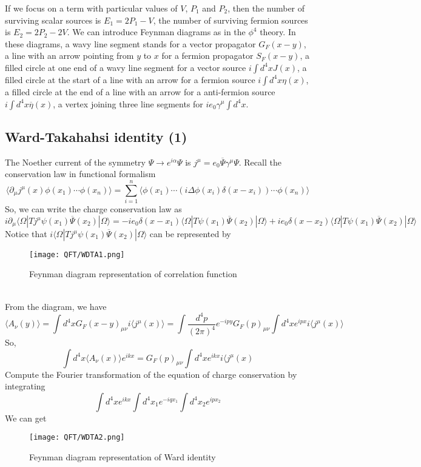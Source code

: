 If we focus on a term with particular values of $V$, $P_1$ and $P_2$, then the number of surviving scalar sources is $E_1 = 2P_1-V$, the number of surviving fermion sources is $E_2 = 2P_2-2V$.
We can introduce Feynman diagrams as in the $\phi^4$ theory. In these diagrams, a wavy line segment stands for a vector propagator $G_F(x-y)$, a line with an arrow pointing from $y$ to $x$ for a fermion propagator $S_F(x-y)$, a filled circle at one end of a wavy line segment for a vector source $i\int d^4x J(x)$, a filled circle at the start of a line with an arrow for a fermion source $i\int d^4x \eta(x)$, a filled circle at the end of a line with an arrow for a anti-fermion source $i\int d^4x \overline{\eta}(x)$, a vertex joining three line segments for $ie_0\gamma^{\mu}\int d^4x$.

\subsection{Ward-Takahahsi identity (1)}
The Noether current of the symmetry $\Psi \to e^{i\alpha}\Psi$ is $j^{\mu} = e_0\overline{\Psi}\gamma^{\mu}\Psi$. Recall the conservation law in functional formalism
\[\langle \partial_{\mu} j^{\mu}(x) \phi(x_1)\cdots\phi(x_n) \rangle  = \sum_{i=1}^{n} \langle \phi(x_1) \cdots (i\Delta \phi(x_i)\delta(x-x_i)) \cdots \phi(x_n) \rangle\]
So, we can write the charge conservation law as
\[i\partial_{\mu} \langle \Omega | T j^{\mu} \psi(x_1) \overline{\Psi}(x_2)| \Omega\rangle = -ie_0\delta(x-x_1)\langle \Omega | T \psi(x_1) \overline{\Psi}(x_2)| \Omega\rangle + ie_0\delta(x-x_2)\langle \Omega | T \psi(x_1) \overline{\Psi}(x_2)| \Omega\rangle\]
Notice that $i\langle \Omega | T j^{\mu} \psi(x_1) \overline{\Psi}(x_2)| \Omega\rangle$ can be represented by
\begin{figure}[!h]
\centering
\texttt{[image: QFT/WDTA1.png]}
\caption{Feynman diagram representation of correlation function}
\end{figure}\\
From the diagram, we have
\[\langle A_{\nu}(y) \rangle = \int d^4x G_F(x-y)_{\mu\nu} i\langle j^{\mu}(x) \rangle  = \int \frac{d^4p}{(2\pi)^4} e^{-ipy} G_F(p)_{\mu\nu} \int d^4x e^{ipx} i\langle j^{\mu}(x) \rangle\]
So,
\[\int d^4x \langle A_{\nu}(x) \rangle e^{ikx} = G_F(p)_{\mu\nu} \int d^4x e^{ikx} i\langle j^{\mu}(x)\]
Compute the Fourier transformation of the equation of charge conservation by integrating
\[\int d^4x e^{ikx} \int d^4x_1 e^{-iqx_1} \int d^4x_2 e^{ipx_2}\]
We can get
\begin{figure}[!h]
\centering
\texttt{[image: QFT/WDTA2.png]}
\caption{Feynman diagram representation of Ward identity}
\end{figure}\\
